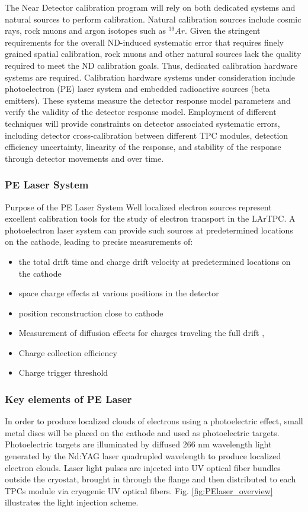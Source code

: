 The Near Detector calibration program will rely on both dedicated systems and natural sources to perform calibration. Natural calibration sources include cosmic rays, rock muons and argon isotopes such as $^{39}Ar$. Given the stringent requirements for the overall ND-induced systematic error that requires finely grained spatial calibration, rock muons and other natural sources lack the quality required to meet the ND calibration goals. Thus, dedicated calibration hardware systems are required.  Calibration hardware systems under consideration include photoelectron (PE) laser system and embedded radioactive sources (beta emitters). These systems measure the detector response model parameters and verify the validity of the detector response model. Employment of different techniques will provide constraints on detector associated systematic errors, including detector cross-calibration between different TPC modules, detection efficiency uncertainty, linearity of the response, and stability of the response through detector movements and over time.

\subsubsection{PE Laser System}
Purpose of the PE Laser System
        Well localized electron sources represent excellent calibration tools for the study of electron transport in the LArTPC. A photoelectron laser system can provide such sources at predetermined locations on the cathode, leading to precise measurements of:
        
\begin{itemize}
        \item
    the total drift time and charge drift velocity at predetermined locations on the cathode
    \item
    space charge effects at various positions in the detector
    \item
    position reconstruction close to cathode
    \item
    Measurement of diffusion effects for charges traveling the full  drift                 ,
    \item
    Charge collection efficiency
    \item
    Charge trigger threshold
\end{itemize}

\subsubsection{Key elements of PE Laser}
In order to produce localized clouds of electrons using a photoelectric effect, small metal discs will be placed on the cathode and used as photoelectric targets. Photoelectric targets are illuminated by diffused 266 nm wavelength light  generated by the Nd:YAG laser quadrupled wavelength to produce localized electron clouds. Laser light pulses are injected into UV optical fiber bundles outside the cryostat, brought in through the flange and then distributed to each TPCs module via cryogenic UV optical fibers. Fig. \ref{fig:PElaser_overview} illustrates the light injection scheme.

